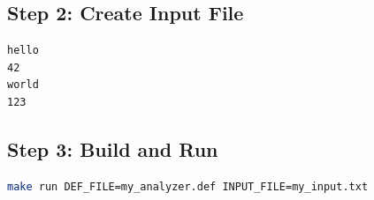 \documentclass[a4paper,12pt]{report}
\begin{document}
\subsection{Step 2: Create Input File}
\begin{lstlisting}[caption=my\_input.txt]
hello
42
world
123
\end{lstlisting}

\subsection{Step 3: Build and Run}
\begin{lstlisting}[language=bash]
make run DEF_FILE=my_analyzer.def INPUT_FILE=my_input.txt
\end{lstlisting}
\end{document}
